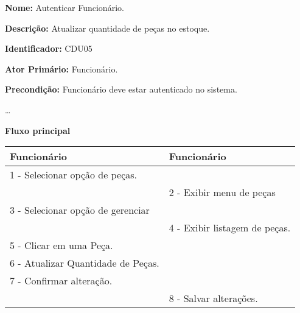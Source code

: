 \par
\textbf{Nome:} Autenticar Funcionário.
\par
\textbf{Descrição:}  Atualizar quantidade de peças no estoque.	
\par 
\textbf{Identificador:} CDU05
\par
\textbf{Ator Primário:} Funcionário.	
\par
\textbf{Precondição:} Funcionário deve estar autenticado no sistema.
\par
\ldots
\par
\textbf{Fluxo principal}\par
\begin{tabular}{|p{7cm}|p{7cm}|}
	\hline 
	
	
	Funcionário
	& 
	
	Funcionário
	\\ 
	\hline 
	
	
	1 - Selecionar opção de peças.
	&  \\ 
	\hline 
	& 
	
	2 - Exibir menu de peças
	\\ 
	\hline 
	
	
	3 - Selecionar opção de gerenciar
	&  \\ 
	\hline 
	& 
	
	4 - Exibir listagem de peças.
	\\ 
	\hline 
	
	
	5 - Clicar em uma Peça.
	&  \\ 
	\hline 
	
	
	6 - Atualizar Quantidade de Peças.
	&  \\ 
	\hline 
	
	
	7 - Confirmar alteração.
	&  \\ 
	\hline 
	& 
	
	8 - Salvar alterações.
	\\ 
	\hline 
\end{tabular} 
\vspace{12px}
